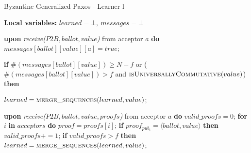 \begin{algorithm}
	\caption{Byzantine Generalized Paxos - Learner l}
	\label{BFT-Learn}
	\textbf{Local variables:} $learned = \bot,\ messages = \bot$ 
	\begin{algorithmic}[1]
		\State \textbf{upon} \textit{receive($P2B, ballot, value$)} from acceptor $a$ \textbf{do}
		\State \hspace{\algorithmicindent} $messages[ballot][value][a] = true$;
		\State \hspace{\algorithmicindent} \parbox{\linewidth}{\textbf{if} $\#(messages[ballot][value]) \geq N-f$ or ($\#(messages[ballot][value]) > f$ and $\Call{isUniversallyCommutative}{value}$) \textbf{then}}
		\State \hspace{\algorithmicindent}\hspace{\algorithmicindent} $learned = \Call{merge\_sequences}{learned, value}$;
		
		\State
		\State \textbf{upon} \textit{receive($P2B, ballot, value, proofs$)} from acceptor $a$ \textbf{do}
		\State \hspace{\algorithmicindent} $valid\_proofs = 0$;
		\State \hspace{\algorithmicindent} \textbf{for} $i$ \textbf{in} $acceptors$ \textbf{do}
		\State \hspace{\algorithmicindent}\hspace{\algorithmicindent} $proof = proofs[i]$;
		\State \hspace{\algorithmicindent}\hspace{\algorithmicindent} \textbf{if} $proof_{pub_i} = \langle ballot, value \rangle$ \textbf{then}
		\State \hspace{\algorithmicindent}\hspace{\algorithmicindent}\hspace{\algorithmicindent} 
		$valid\_proofs \mathrel{+{=}} 1$;
		\State
		\State \hspace{\algorithmicindent} \textbf{if} $valid\_proofs > f$ \textbf{then}
		\State \hspace{\algorithmicindent}\hspace{\algorithmicindent} $learned = \Call{merge\_sequences}{learned, value}$;
	\end{algorithmic}
\end{algorithm}
